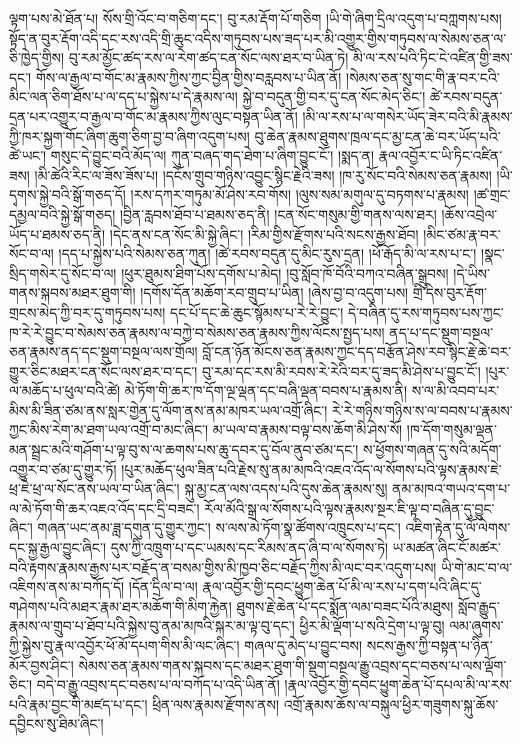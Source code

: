 \documentclass{article}
\begin{document}
ལྟག་པས་མེ་ཐོན་པ། སོས་གྲི་འོང་བ་གཅིག་དང་། བུ་རམ་རྡོག་པོ་གཅིག །ཡི་གེ་ཞིག་དྲིལ་འདུག་པ་བཀླགས་པས། སྟོད་ན་བུར་རྡོག་འདི་དང་རས་འདི་གྲི་ཆུང་འདིས་གཏུབས་པས་ཟད་པར་མི་འགྱུར་གྱིས་གཏུབས་ལ་སེམས་ཅན་ལ་ཅི་ཁྱེད་གྱིས། བུ་རམ་མྱོང་ཚད་རས་ལ་རེག་ཚད་ངན་སོང་ལས་ཐར་བ་ཡིན་ཏེ། མི་ལ་རས་པའི་ཏིང་ངེ་འཛིན་གྱི་ཟས་དང་། གོས་ལ་རྒྱལ་བ་གོང་མ་རྣམས་ཀྱིས་ཀྱང་བྱིན་གྱིས་བརླབས་པ་ཡིན་ནོ། །སེམས་ཅན་སུ་གང་གི་རྣ་བར་ངའི་མིང་ལན་ཅིག་ཐོས་པ་ལ་དད་པ་སྐྱེས་པ་དེ་རྣམས་ལ། སྐྱེ་བ་བདུན་གྱི་བར་དུ་ངན་སོང་མེད་ཅིང་། ཚེ་རབས་བདུན་དྲན་པར་འགྱུར་བ་རྒྱལ་བ་གོང་མ་རྣམས་ཀྱིས་ལུང་བསྟན་ཡིན་ནོ། །མི་ལ་རས་པ་ལ་གསེར་ཡོད་ཟེར་བའི་མི་རྣམས་ཀྱི་ཁར་སྐྱག་གོང་ཞིག་ཆུག་ཅིག་བྱ་བ་ཞིག་འདུག་པས། བུ་ཆེན་རྣམས་ཐུགས་ཁྲལ་དང་མྱ་ངན་ཆེ་བར་ཡོད་པའི་ཚེ་ཡང་། གསུང་དེ་བྱུང་བའི་མོད་ལ། ཀུན་བཞད་གད་ཐེག་པ་ཞིག་བྱུང་ངོ་། །སྨད་ན། རྣལ་འབྱོར་ང་ཡི་ཏིང་འཛིན་ཟས། །མི་ཚེའི་རིང་ལ་ཟོས་ཟོས་པ། །དངོས་གྲུབ་གཉིས་འབྱུང་སྙིང་རྗེའི་ཟས། །ཁ་རུ་སོང་བའི་སེམས་ཅན་རྣམས། །ཡི་དྭགས་སྐྱེ་བའི་སྒོ་གཅད་དོ། །རས་དཀར་གཏུམ་མོ་ཤེས་རབ་གོས། །ལུས་སམ་མགུལ་དུ་བཏགས་པ་རྣམས། །ཚ་གྲང་དམྱལ་བའི་སྐྱེ་སྒོ་གཅད། །བྱིན་རླབས་ཐོབ་པ་ཐམས་ཅད་ནི། །ངན་སོང་གསུམ་གྱི་གནས་ལས་ཐར། །ཆོས་འབྲེལ་ཡོད་པ་ཐམས་ཅད་ནི། །དེང་ནས་ངན་སོང་མི་སྐྱེ་ཞིང་། །རིམ་གྱིས་རྫོགས་པའི་སངས་རྒྱས་ཐོབ། །མིང་ཙམ་རྣ་བར་སོང་བ་ལ། །དད་པ་སྐྱེས་པའི་སེམས་ཅན་ཀུན། །ཚེ་རབས་བདུན་དུ་མིང་རུས་དྲན། །ཕོ་རྒོད་མི་ལ་རས་པ་ང་། །སྣང་སྲིད་གསེར་དུ་སོང་བ་ལ། །ཕུར་ཐུམས་ཐིག་པོས་དགོས་པ་མེད། །བུ་སློབ་ཁོ་བོའི་བཀའ་བཞིན་སྒྲུབས། །དེ་ཡིས་གནས་སྐབས་མཐར་ཐུག་གི། །དགོས་དོན་མཆོག་རབ་གྲུབ་པ་ཡིན། །ཞེས་བྱ་བ་འདུག་པས། གྲི་དེས་བུར་རྡོག་གྲངས་མེད་ཀྱི་བར་དུ་གཏུབས་པས། དང་པོ་དང་ཆེ་ཆུང་སྙོམས་པ་རེ་རེ་བྱུང་། དེ་བཞིན་དུ་རས་གཏུབས་པས་ཀྱང་ཁ་རེ་རེ་བྱུང་བ་སེམས་ཅན་རྣམས་ལ་བཀྱེ་བ་སེམས་ཅན་རྣམས་ཀྱིས་ལོངས་སྤྱད་པས། ནད་པ་དང་སྡུག་བསྔལ་ཅན་རྣམས་ནད་དང་སྡུག་བསྔལ་ལས་གྲོལ། བློ་ངན་ཉོན་མོངས་ཅན་རྣམས་ཀྱང་དད་བརྩོན་ཤེས་རབ་སྙིང་རྗེ་ཆེ་བར་གྱུར་ཅིང་མཐར་ངན་སོང་ལས་ཐར་བ་དང་། བུ་རམ་དང་རས་མི་རབས་རེ་རེའི་བར་དུ་ཟད་མི་ཤེས་པ་བྱུང་ངོ་། །པུར་ལ་མཆོད་པ་ཕུལ་བའི་ཚེ། མེ་ཏོག་གི་ཆར་ཁ་དོག་ལྔ་ལྡན་དང་བཞི་ལྡན་བབས་པ་རྣམས་ནི། ས་ལ་མི་འབབ་པར་མིས་མི་ཟིན་ཙམ་ནས་སླར་གྱེན་དུ་ལོག་ནས་ནམ་མཁར་ཡལ་འགྲོ་ཞིང་། རེ་རེ་གཉིས་གཉིས་ས་ལ་བབས་པ་རྣམས་ཀྱང་མིས་རེག་མ་ཐག་ཡལ་འགྲོ་བ་མང་ཞིང་། མ་ཡལ་བ་རྣམས་བལྟ་བས་ཆོག་མི་ཤེས་སོ། །ཁ་དོག་གསུམ་ལྡན་མན་སྦྲང་མའི་གཤོག་པ་ལྟ་བུ་ས་ལ་ཆགས་པས་ཆུ་དབར་དུ་བོལ་ནུབ་ཙམ་དང་། ས་ཕྱོགས་གཞན་དུ་སའི་མདོག་འགྱུར་བ་ཙམ་དུ་གྱུར་ཏོ། །པུར་མཆོད་ཕུལ་ཟིན་པའི་རྗེས་སུ་ནམ་མཁའི་འཇའ་འོད་ལ་སོགས་པའི་ལྟས་རྣམས་ཇེ་ཕྲ་ཇེ་ཕྲ་ལ་སོང་ནས་ཡལ་བ་ཡིན་ཞིང་། སྐུ་མྱ་ངན་ལས་འདས་པའི་དུས་ཆེན་རྣམས་སུ། ནམ་མཁའ་གཡའ་དག་པ་ལ་མེ་ཏོག་གི་ཆར་འཇའ་འོད་དང་དྲི་བཟང་། རོལ་མོའི་སྒྲ་ལ་སོགས་པའི་ལྟས་རྣམས་སྔར་ཇི་ལྟ་བ་བཞིན་དུ་བྱུང་ཞིང་། གཞན་ཡང་ནམ་ཟླ་དགུན་དུ་གྱུར་ཀྱང་། ས་ལས་མེ་ཏོག་སྣ་ཚོགས་འཁྲུངས་པ་དང་། འཇིག་རྟེན་དུ་ལོ་ལེགས་དང་སྐྱ་རྒྱལ་བྱུང་ཞིང་། དུས་ཀྱི་འཁྲུག་པ་དང་ཡམས་དང་རིམས་ནད་ཞི་བ་ལ་སོགས་ཏེ། ཡ་མཚན་ཞིང་ངོ་མཚར་བའི་རྟགས་རྣམས་རྒྱས་པར་བརྗོད་ན་བསམ་གྱིས་མི་ཁྱབ་ཅིང་བརྗོད་ཀྱིས་མི་ལང་བར་འདུག་པས། ཡི་གེ་མང་བ་ལ་འཇིགས་ནས་མ་བཀོད་དོ། །དོན་དྲིལ་བ་ལ། རྣལ་འབྱོར་གྱི་དབང་ཕྱུག་ཆེན་པོ་མི་ལ་རས་པ་དག་པའི་ཞིང་དུ་གཤེགས་པའི་མཐར་རྣམ་ཐར་མཆོག་གི་མིག་རྐྱེན། ཐུགས་རྗེ་ཆེན་པོ་དང་སྨོན་ལམ་བཟང་པོའི་མཐུས། སློབ་རྒྱུད་རྣམས་ལ་གྲུབ་པ་ཐོབ་པའི་སྐྱེས་བུ་ནམ་མཁའི་སྐར་མ་ལྟ་བུ་དང་། ཕྱིར་མི་ལྡོག་པ་སའི་དྲེག་པ་ལྟ་བུ། ལམ་ཞུགས་ཀྱི་སྐྱེས་བུ་རྣལ་འབྱོར་ཕོ་མོ་དཔག་གིས་མི་ལང་ཞིང་། གཞལ་དུ་མེད་པ་བྱུང་བས། སངས་རྒྱས་ཀྱི་བསྟན་པ་ཉིན་མོར་བྱས་ཤིང་། སེམས་ཅན་རྣམས་གནས་སྐབས་དང་མཐར་ཐུག་གི་སྡུག་བསྔལ་རྒྱུ་འབྲས་དང་བཅས་པ་ལས་ལྡོག་ཅིང་། བདེ་བ་རྒྱུ་འབྲས་དང་བཅས་པ་ལ་བཀོད་པ་འདི་ཡིན་ནོ། །རྣལ་འབྱོར་གྱི་དབང་ཕྱུག་ཆེན་པོ་དཔལ་མི་ལ་རས་པའི་རྣམ་བྱང་གི་མཛད་པ་དང་། ཕྲིན་ལས་རྣམས་རྫོགས་ནས། འགྲོ་རྣམས་ཆོས་ལ་བསྐུལ་ཕྱིར་གཟུགས་སྐུ་ཆོས་དབྱིངས་སུ་ཐིམ་ཞིང་། 
\end{document}
